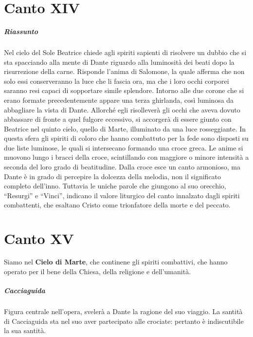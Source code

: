\documentclass[a4paper, twoside, titlepage]{book}
\begin{document}
\chapter{Canto XIV}

\paragraph{Riassunto} Nel cielo del Sole Beatrice chiede agli spiriti sapienti di risolvere un dubbio che si sta spacciando alla mente di Dante riguardo alla luminosità dei beati dopo la risurrezione della carne. Risponde l'anima di Salomone, la quale afferma che non solo essi conserveranno la luce che li fascia ora, ma che i loro occhi corporei saranno resi capaci di sopportare simile splendore. Intorno alle due corone che si erano formate precedentemente appare una terza ghirlanda, così luminosa da abbagliare la vista di Dante. Allorché egli risolleverà gli occhi che aveva dovuto abbassare di fronte a quel fulgore eccessivo, si accorgerà di essere giunto con Beatrice nel quinto cielo, quello di Marte, illuminato da una luce rosseggiante. In questa sfera gli spiriti di coloro che hanno combattuto per la fede sono disposti su due liste luminose, le quali si intersecano formando una croce greca. Le anime si muovono lungo i bracci della croce, scintillando con maggiore o minore intensità a seconda del loro grado di beatitudine. Dalla croce esce un canto armonioso, ma Dante è in grado di percepire la dolcezza della melodia, non il significato completo dell'inno. Tuttavia le uniche parole che giungono al suo orecchio, “Resurgi” e “Vinci”, indicano il valore liturgico del canto innalzato dagli spiriti combattenti, che esaltano Cristo come trionfatore della morte e del peccato.

\chapter{Canto XV}

Siamo nel \textbf{Cielo di Marte}, che continene gli spiriti combattivi, che hanno operato per il bene della Chiesa, della religione e dell'umanità.

\paragraph{Cacciaguida} Figura centrale nell’opera, svelerà a Dante la ragione del suo viaggio.
La santità di Cacciaguida sta nel suo aver partecipato alle crociate: pertanto è indiscutibile la sua santità.
\end{document}
